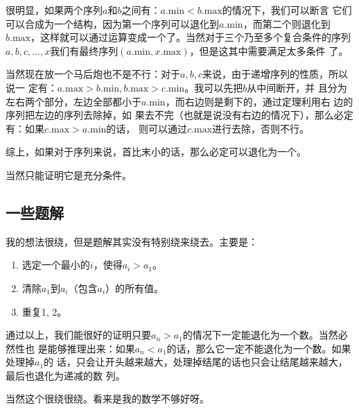\def\t#1|{\text{#1}}
很明显，如果两个序列$a$和$b$之间有：$a.\t min|<b.\t max|$的情况下，我们可以断言
它们可以合成为一个结构，因为第一个序列可以退化到$a.\t min|$，而第二个则退化到$
b.\t max|$，这样就可以通过运算变成一个了。当然对于三个乃至多个复合条件的序列$a, b, 
c, \ldots, x$我们有最终序列$(a.\t min|, x.\t max|)$，但是这其中需要满足太多条件
了。

当然现在放一个马后炮也不是不行：对于$a, b, c$来说，由于递增序列的性质，所以说一
定有：$a.\t max|>b.\t min|, b.\t max| > c.\t min|$。我可以先把$b$从中间断开，并
且分为左右两个部分，左边全部都小于$a.\t min|$，而右边则是剩下的，通过定理利用右
边的序列把左边的序列去除掉，如
果去不完（也就是说没有右边的情况下），那么必定有：如果$c.\t max|>a.\t min|$的话，
则可以通过$c.\t max|$进行去除，否则不行。

综上，如果对于序列来说，首比末小的话，那么必定可以退化为一个。

当然只能证明它是充分条件。

\subsection{一些题解}

我的想法很绕，但是题解其实没有特别绕来绕去。主要是：
\begin{enumerate}
\item 选定一个最小的$i$，使得$a_i > a_1$。
\item 清除$a_1$到$a_i$（包含$a_i$）的所有值。
\item 重复1, 2。
\end{enumerate}

通过以上，我们能很好的证明只要$a_n>a_1$的情况下一定能退化为一个数。当然必然性也
是能够推理出来：如果$a_n<a_1$的话，那么它一定不能退化为一个数。如果处理掉$a_1$的
话，只会让开头越来越大，处理掉结尾的话也只会让结尾越来越大，最后也退化为递减的数
列。

当然这个很绕很绕。看来是我的数学不够好呀。

